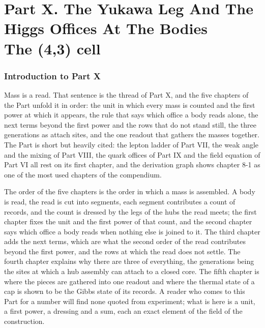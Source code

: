 \clearpage
\part*{Part X. The Yukawa Leg And The Higgs Offices At The Bodies\\[5pt]{\large The (4,3) cell}}
\label{atlaspart:10-cell-4-3-yukawa}
\section*{Introduction to Part X}\label{narr:part:VIII}
Mass is a read. That sentence is the thread of Part X, and the five chapters of the Part unfold it in order: the unit in which every mass is counted and the first power at which it appears, the rule that says which office a body reads alone, the next terms beyond the first power and the rows that do not stand still, the three generations as attach sites, and the one readout that gathers the masses together. The Part is short but heavily cited: the lepton ladder of Part VII, the weak angle and the mixing of Part VIII, the quark offices of Part IX and the field equation of Part VI all rest on its first chapter, and the derivation graph shows chapter 8-1 as one of the most used chapters of the compendium.

The order of the five chapters is the order in which a mass is assembled. A body is read, the read is cut into segments, each segment contributes a count of records, and the count is dressed by the legs of the hubs the read meets; the first chapter fixes the unit and the first power of that count, and the second chapter says which office a body reads when nothing else is joined to it. The third chapter adds the next terms, which are what the second order of the read contributes beyond the first power, and the rows at which the read does not settle. The fourth chapter explains why there are three of everything, the generations being the sites at which a hub assembly can attach to a closed core. The fifth chapter is where the pieces are gathered into one readout and where the thermal state of a cap is shown to be the Gibbs state of its records. A reader who comes to this Part for a number will find none quoted from experiment; what is here is a unit, a first power, a dressing and a sum, each an exact element of the field of the construction.

